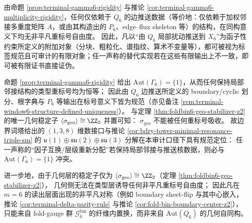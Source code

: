 \begin{remark}\label{rem:terminal-window6-structure-defined-uniqueness}
由命题 \ref{prop:terminal-gamma6-rigidity} 与推论 \ref{cor:terminal-gamma6-multiplicity-rigidity}，任何仅依赖于 \(Q_6\) 的边推送数据（等价地：仅依赖于加权邻接多重度矩阵 \(A\)，或由其构造出的 \(P_6\)、edge--flux skeleton 等）的结构，在同构意义下均无非平凡重标号自由度。
因此，凡以“由 \(Q_6\) 局部扰动推送到 \(X_6\)”为函子性约束所定义的附加对象（分块、粗粒化、谱指纹、算术不变量等），都可被视为标签规范且可审计的有限对象；任一声称的替代实现若在这些有限输出上不一致，即可被有限证书直接证伪。
\end{remark}

\begin{remark}\label{rem:window6-no-relabeling-factor-localization}
命题 \ref{prop:terminal-gamma6-rigidity} 给出 \(\mathrm{Aut}(\Gamma_6)=\{1\}\)，从而任何保持局部邻接结构的类型重标号均为恒等；
因此由 \(Q_6\) 边推送所定义的 boundary/cyclic 划分、根字典与 \(P_6\) 等输出在标号意义下皆为规范（亦见备注 \ref{rem:terminal-window6-structure-defined-uniqueness}）。
与定理 \ref{thm:foldbin6-geo-stabilizer-z2} 的唯一几何稳定子 \(\langle\sigma_{\mathrm{geo}}\rangle\cong\ZZ_2\) 并置可知：
\(\sigma_{\mathrm{geo}}\) 不能被任何重标号吸收。
故边界词塔给出的 \((1,3,8)\) 维数接口与推论 \ref{cor:bdry-tower-minimal-resonance-triple-sm} 的
\(\mathfrak u(1)\oplus\mathfrak{su}(2)\oplus\mathfrak{su}(3)\) 分解在本审计口径下具有规范定位：
任一声称的“因子互换/层级重新分配”若保持局部邻接与推送核数据，则必与 \(\mathrm{Aut}(\Gamma_6)=\{1\}\) 冲突。
\par
进一步地，由于几何层的稳定子仅为 \(\langle\sigma_{\mathrm{geo}}\rangle\cong\ZZ_2\)（定理 \ref{thm:foldbin6-geo-stabilizer-z2}），
几何侧无法在类型层诱导任何非平凡重标号自由度；
因此凡在 \(m=6\) 的读出层面出现的非平凡对称（例如 boundary sheet-flip 与其中心嵌入，推论 \ref{cor:terminal-delta-parity-rule} 与推论 \ref{cor:fold-bin-boundary-center-z2}），
只能来自 fold-gauge 群 \(\mathcal{G}^{\mathrm{bin}}_6\) 的纤维内置换，而非来自 \(\mathrm{Aut}(Q_6)\) 的几何自同构。
\end{remark}

